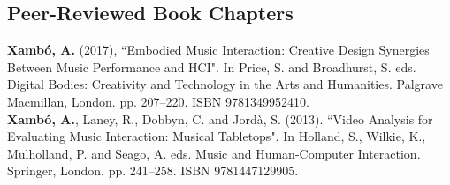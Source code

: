 \documentclass[10pt, a4paper]{article}
\newcommand{\years}[1]{\marginnote{\scriptsize #1}}
\begin{document}
\subsection*{Peer-Reviewed Book Chapters}
\noindent
\years{2016}\textbf{Xambó, A.} (2017), “Embodied Music Interaction: Creative Design Synergies Between Music Performance and HCI". In Price, S. and Broadhurst, S. eds. Digital Bodies: Creativity and Technology in the Arts and Humanities. Palgrave Macmillan, London. pp. 207--220. ISBN 9781349952410.\\
\years{2013}\textbf{Xambó, A.}, Laney, R., Dobbyn, C. and Jordà, S. (2013). “Video Analysis for Evaluating Music Interaction: Musical Tabletops". In Holland, S., Wilkie, K., Mulholland, P. and Seago, A. eds. Music and Human-Computer Interaction. Springer, London. pp. 241--258. ISBN 9781447129905.
\end{document}
